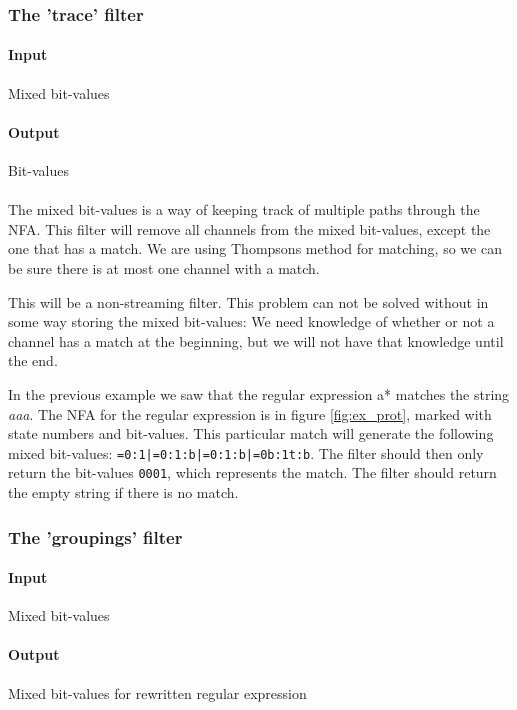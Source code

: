 \subsubsection{The 'trace' filter}
\label{sec:desc_materialize}
\paragraph{Input} Mixed bit-values
\paragraph{Output} Bit-values
\paragraph{}

The mixed bit-values is a way of keeping track of multiple paths
through the NFA. This filter will remove all channels from the mixed
bit-values, except the one that has a match. We are using
Thompsons method for matching, so we can be sure there is at most one
channel with a match. 

This will be a non-streaming filter. This problem can not be solved
without in some way storing the mixed bit-values: We need knowledge of
whether or not a channel has a match at the beginning, but we will not
have that knowledge until the end.

\begin{example}
In the previous example we saw that the regular expression \textsf{a*}
matches the string \textsl{aaa}. The NFA for the regular expression is
in figure \vref{fig:ex_prot}, marked with state numbers and
bit-values. This particular match will generate the following mixed
bit-values: \texttt{=0:1|=0:1:b|=0:1:b|=0b:1t:b}. The filter should
then only return the bit-values \texttt{0001}, which represents the
match. The filter should return the empty string if there is no match.
\end{example}


\subsubsection{The 'groupings' filter}
\label{sec:groupings_filter_analysis}
\paragraph{Input} Mixed bit-values
\paragraph{Output} Mixed bit-values for rewritten regular expression
